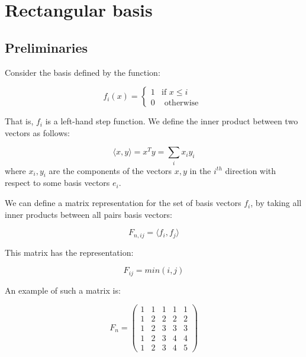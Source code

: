 \chapter{Rectangular basis}

\section{Preliminaries}
Consider the basis defined by the function:

\begin{equation}
f_i\left(x\right) =
\begin{cases}
1 & \text{if } x \leq i \\
0 & \text{ otherwise } 
\end{cases}
\label{basis}
\end{equation}

That is, \(f_i\) is a left-hand step function. We define the inner product between two vectors as follows:

\begin{definition}
\begin{equation}
\langle x, y \rangle = x^T y = \sum_i x_i y_i
\end{equation}	
where \(x_i, y_i\) are the components of the vectors \(x,y\) in the \(i^{th}\) direction with respect to some basis vectors \(e_i\).
\end{definition}

We can define a matrix representation for the set of basis vectors \(f_i\), by taking all inner products between all pairs basis vectors:

\begin{definition}
\begin{equation}
F_{n, ij} = \langle f_i, f_j \rangle
\end{equation}

This matrix has the representation:

\begin{equation}
F_{ij} = min(i,j)
\end{equation}

An example of such a matrix is:

\begin{equation}
F_n= \begin{pmatrix}
 1 & 1 & 1 & 1  & 1 \\
  1 & 2 & 2 & 2  & 2\\
     1 & 2 & 3 & 3  & 3  \\
    1 & 2 & 3 & 4  & 4  \\
     1 & 2 & 3 & 4  & 5 
\end{pmatrix}
\end{equation}
\end{definition}

